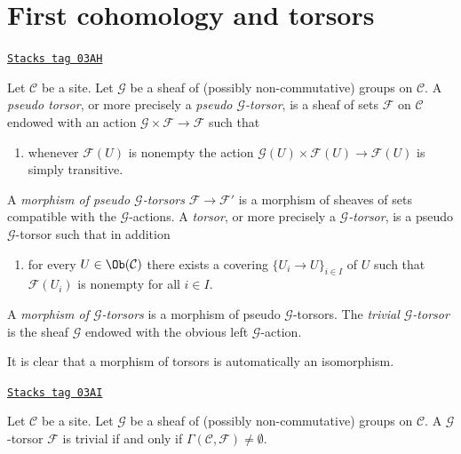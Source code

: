 \section{First cohomology and torsors}
\label{sites-cohomology-section-h1-torsors}
\begin{definition}[Torsor]
\label{sites-cohomology-definition-torsor}
\href{https://stacks.math.columbia.edu/tag/03AH}{\texttt{Stacks tag 03AH}}

Let $\mathcal{C}$ be a site.
Let $\mathcal{G}$ be a sheaf of (possibly non-commutative)
groups on $\mathcal{C}$.
A {\it pseudo torsor}, or more precisely a
{\it pseudo $\mathcal{G}$-torsor}, is a sheaf
of sets $\mathcal{F}$ on $\mathcal{C}$ endowed with an action
$\mathcal{G} \times \mathcal{F} \to \mathcal{F}$ such that
\begin{enumerate}
\item whenever $\mathcal{F}(U)$ is nonempty the action
$\mathcal{G}(U) \times \mathcal{F}(U) \to \mathcal{F}(U)$
is simply transitive.
\end{enumerate}
A {\it morphism of pseudo $\mathcal{G}$-torsors}
$\mathcal{F} \to \mathcal{F}'$
is a morphism of sheaves of sets compatible with the
$\mathcal{G}$-actions.
A {\it torsor}, or more precisely a
{\it $\mathcal{G}$-torsor}, is a pseudo $\mathcal{G}$-torsor such that
in addition
\begin{enumerate}
\item[(2)] for every $U \in \Ob(\mathcal{C})$
there exists a covering $\{U_i \to U\}_{i \in I}$ of $U$
such that $\mathcal{F}(U_i)$ is nonempty for all $i \in I$.
\end{enumerate}
A {\it morphism of $\mathcal{G}$-torsors} is a morphism of
pseudo $\mathcal{G}$-torsors.
The {\it trivial $\mathcal{G}$-torsor}
is the sheaf $\mathcal{G}$ endowed with the obvious left
$\mathcal{G}$-action.
\end{definition}

It is clear that a morphism of torsors is automatically an isomorphism.

\begin{lemma}
\label{sites-cohomology-lemma-trivial-torsor}
\href{https://stacks.math.columbia.edu/tag/03AI}{\texttt{Stacks tag 03AI}}

Let $\mathcal{C}$ be a site.
Let $\mathcal{G}$ be a sheaf of (possibly non-commutative)
groups on $\mathcal{C}$.
A $\mathcal{G}$-torsor $\mathcal{F}$ is trivial if and only if
$\Gamma(\mathcal{C}, \mathcal{F}) \not = \emptyset$.
\end{lemma}

